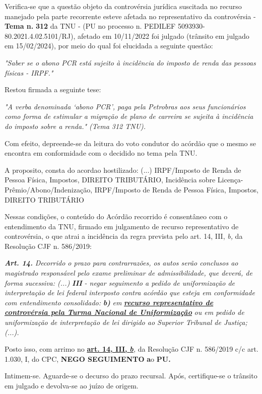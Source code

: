 \documentclass[12pt]{article}
\begin{document}
\justifying
\noindent Verifica-se que a questão objeto da controvérsia jurídica suscitada no recurso manejado pela parte recorrente esteve afetada no representativo da controvérsia - \textbf{Tema n. }\textbf{312} da TNU - (PU no processo n. PEDILEF 5093930-80.2021.4.02.5101/RJ),  afetado em 10/11/2022 foi julgado (trânsito em julgado em 15/02/2024), por meio do qual foi elucidada a seguinte questão:

\noindent \textit{"Saber se o abono PCR está sujeito à incidência do imposto de renda das pessoas físicas - IRPF."}

\noindent Restou firmada a seguinte tese:

\noindent \textit{"A verba denominada ‘abono PCR’, paga pela Petrobras aos seus funcionários como forma de estimular a migração de plano de carreira se sujeita à incidência do imposto sobre a renda." (Tema 312 TNU).}

\noindent Com efeito, depreende-se da leitura do voto condutor do acórdão que o mesmo se encontra em conformidade com o decidido no  tema pela TNU.

\noindent A proposito, consta do acordao hostilizado: (...) IRPF/Imposto de Renda de Pessoa Física, Impostos, DIREITO TRIBUTÁRIO, Incidência sobre Licença-Prêmio/Abono/Indenização, IRPF/Imposto de Renda de Pessoa Física, Impostos, DIREITO TRIBUTÁRIO

\noindent Nessas condições, o conteúdo do Acórdão recorrido é consentâneo com o entendimento da TNU, firmado em julgamento de recurso representativo de controvérsia, o que atrai a incidência da regra prevista pelo art. 14, III, \textit{b,} da Resolução CJF n. 586/2019:

\noindent \textit{\textbf{Art. 14.}}\textit{ Decorrido o prazo para contrarrazões, os autos serão conclusos ao magistrado responsável pelo exame preliminar de admissibilidade, que deverá, de forma sucessiva: (...) }\textit{\textbf{III }}\textit{- negar seguimento a pedido de uniformização de interpretação de lei federal interposto contra acórdão que esteja em conformidade com entendimento consolidado: }\textit{\textbf{b)}}\textit{ em }\uline{\textit{\textbf{recurso representativo de controvérsia pela Turma Nacional de Uniformização}}}\textit{ ou em pedido de uniformização de interpretação de lei dirigido ao Superior Tribunal de Justiça;(...).}

\noindent Posto isso, com arrimo no \uline{\textbf{art. 14, III, }}\uline{\textit{\textbf{b}}}\textit{,} da Resolução CJF n. 586/2019 c/c art. 1.030, I, do CPC, \textbf{NEGO SEGUIMENTO }\textbf{a}o\textbf{ PU}\textbf{.}

\noindent Intimem-se. Aguarde-se o decurso do prazo recursal. Após, certifique-se o trânsito em julgado e devolva-se ao juízo de origem.
\end{document}
